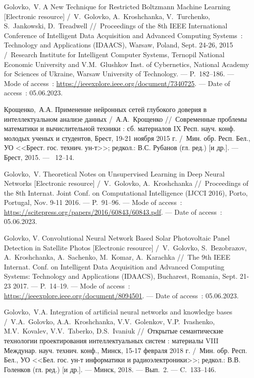 Golovko,~V. A New Technique for Restricted Boltzmann Machine Learning [Electronic resource] /~V.~Golovko, A.~Kroshchanka, V.~Turchenko, S.~Jankowski, D.~Treadwell
\newblock //~Proceedings of the 8th IEEE International Conference of Intelligent Data Acquisition and Advanced Computing Systems~: Technology and Applications (IDAACS), Warsaw, Poland, Sept. 24-26, 2015
\newblock /~Research Institute for Intelligent Computer Systems, Ternopil National Economic University and V.M.~Glushkov Inst. of Cybernetics, National Academy for Sciences of Ukraine, Warsaw University of Technology. ---
\newblock P.~182--186. ---
\newblock Mode of access~: \url{https://ieeexplore.ieee.org/document/7340725}. ---
\newblock Date of access~: 05.06.2023.

Крощенко,~А.А. Применение нейронных сетей глубокого доверия в интеллектуальном анализе данных /~А.А.~Крощенко
\newblock //~Современные проблемы математики и вычислительной техники : сб. материалов IX Респ. науч. конф. молодых ученых и студентов, Брест, 19-21 ноября 2015 г.
\newblock /~Мин. обр. Респ. Бел., УО <<Брест. гос. технич. ун-т>>; редкол.: В.С. Рубанов (гл. ред.) [и др.]. ---
\newblock Брест, 2015. ---
~12--14.

Golovko,~V. Theoretical Notes on Unsupervised Learning in Deep Neural Networks [Electronic resource] /~V.~Golovko, A.~Kroshchanka
\newblock //~Proceedings of the 8th Internat. Joint Conf. on Computational Intelligence (IJCCI 2016), Porto, Portugal, Nov. 9-11 2016. ---
\newblock P.~91--96. ---
\newblock Mode of access~: \url{https://scitepress.org/papers/2016/60843/60843.pdf}. ---
\newblock Date of access~: 05.06.2023.

Golovko, V. Convolutional Neural Network Based Solar Photovoltaic Panel Detection in Satellite Photos [Electronic resource] /~V.~Golovko, S.~Bezobrazov, A.~Kroshchanka, A.~Sachenko, M.~Komar, A.~Karachka
\newblock //~The 9th IEEE Internat. Conf. on Intelligent Data Acquisition and Advanced Computing Systems: Technology and Applications (IDAACS), Bucharest, Romania, Sept. 21-23 2017. ---
\newblock P.~14--19. ---
\newblock Mode of access~: \url{https://ieeexplore.ieee.org/document/8094501}. ---
\newblock Date of access~: 05.06.2023.

Golovko,~V.A. Integration of artiﬁcial neural networks and knowledge bases /~V.A.~Golovko, A.A.~Kroshchanka, V.V.~Golenkov, V.P.~Ivashenko, M.V.~Kovalev, V.V.~Taberko, D.S.~Ivaniuk
\newblock //~Открытые семантические технологии проектирования интеллектуальных систем : материалы VIII Междунар. науч. технич. конф., Минск, 15-17 февраля 2018 г.
\newblock /~Мин. обр. Респ. Бел., УО <<Бел. гос. ун-т информатики и радиоэлектроники>>; редкол.: В.В. Голенков (гл. ред.) [и др.]. ---
\newblock Минск, 2018. ---
\newblock Вып.~2. ---
\newblock C.~133--146.

